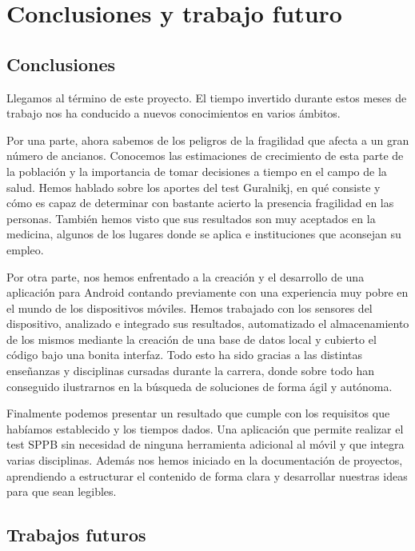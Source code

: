 \chapter{Conclusiones y trabajo futuro}

\section{Conclusiones}

Llegamos al término de este proyecto. El tiempo invertido durante estos meses de trabajo nos ha conducido a nuevos conocimientos en varios ámbitos. 

Por una parte, ahora sabemos de los peligros de la fragilidad que afecta a un gran número de ancianos. Conocemos las estimaciones de crecimiento de esta parte de la población y la importancia de tomar decisiones a tiempo en el campo de la salud. Hemos hablado sobre los aportes del test Guralnikj, en qué consiste y cómo es capaz de determinar con bastante acierto la presencia fragilidad en las personas. También hemos visto que sus resultados son muy aceptados en la medicina, algunos de los lugares donde se aplica e instituciones que aconsejan su empleo.

Por otra parte, nos hemos enfrentado a la creación y el desarrollo de una aplicación para Android contando previamente con una experiencia muy pobre en el mundo de los dispositivos móviles. Hemos trabajado con los sensores del dispositivo, analizado e integrado sus resultados, automatizado el almacenamiento de los mismos mediante la creación de una base de datos local y cubierto el código bajo una bonita interfaz. Todo esto ha sido gracias a las distintas enseñanzas y disciplinas cursadas durante la carrera, donde sobre todo han conseguido ilustrarnos en la búsqueda de soluciones de forma ágil y autónoma.

Finalmente podemos presentar un resultado que cumple con los requisitos que habíamos establecido y los tiempos dados. Una aplicación que permite realizar el test SPPB sin necesidad de ninguna herramienta adicional al móvil y que integra varias disciplinas. Además nos hemos iniciado en la documentación de proyectos, aprendiendo a estructurar el contenido de forma clara y desarrollar nuestras ideas para que sean legibles.

\section{Trabajos futuros}

